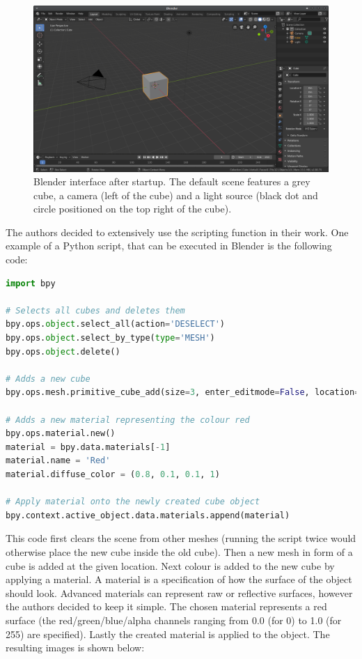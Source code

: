 \begin{figure}[h!]
	\centering
	\includegraphics[width=6.5in]{img/methodology_generatingData_blender_startscreen.png}
	\caption{Blender interface after startup. The default scene features a grey cube, a camera (left of the cube) and a light source (black dot and circle positioned on the top right of the cube).}
	\label{pic:methodology_generatingData_blender_startscreen}
\end{figure}

The authors decided to extensively use the scripting function in their work. One example of a Python script, that can be executed in Blender is the following code:

\begin{lstlisting}[language=python]
import bpy

# Selects all cubes and deletes them
bpy.ops.object.select_all(action='DESELECT')
bpy.ops.object.select_by_type(type='MESH')
bpy.ops.object.delete()

# Adds a new cube
bpy.ops.mesh.primitive_cube_add(size=3, enter_editmode=False, location=(4, 2, 0))

# Adds a new material representing the colour red
bpy.ops.material.new()
material = bpy.data.materials[-1]
material.name = 'Red'
material.diffuse_color = (0.8, 0.1, 0.1, 1)

# Apply material onto the newly created cube object
bpy.context.active_object.data.materials.append(material)
\end{lstlisting}

This code first clears the scene from other meshes (running the script twice would otherwise place the new cube inside the old cube). Then a new mesh in form of a cube is added at the given location. Next colour is added to the new cube by applying a material. A material is a specification of how the surface of the object should look. Advanced materials can represent raw or reflective surfaces, however the authors decided to keep it simple. The chosen material represents a red surface (the red/green/blue/alpha channels ranging from 0.0 (for 0) to 1.0 (for 255) are specified). Lastly the created material is applied to the object. The resulting images is shown below:

